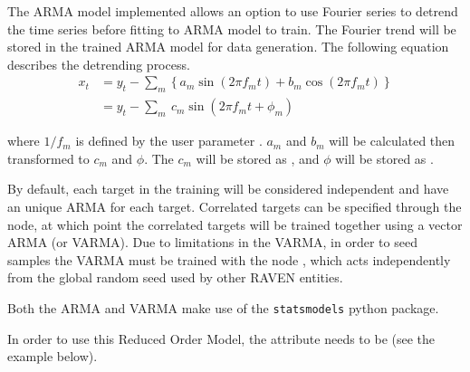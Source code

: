 The ARMA model implemented allows an option to use Fourier series to detrend the time series before fitting to ARMA model to
train. The Fourier trend will be stored in the trained ARMA model for data generation. The following equation
describes the detrending
process.
\begin{equation*}
\begin{aligned}
x_t &= y_t - \sum_m\left\{a_m\sin(2\pi f_mt)+b_m\cos(2\pi f_mt)\right\}  \\
&=y_t - \sum_m\ c_m\sin(2\pi f_mt+\phi_m)
\end{aligned}
\end{equation*}

where $1/f_m$ is defined by the user parameter . \nb $a_m$ and $b_m$ will be calculated then transformed to 
$c_m$ and $\phi$. The $c_m$ will be stored as , and $\phi$ will be stored as .

By default, each target in the training will be considered independent and have an unique ARMA for each
target.  Correlated targets can be specified through the  node, at which point
the correlated targets will be trained together using a vector ARMA (or VARMA). Due to limitations in
the VARMA, in order to seed samples the VARMA must be trained with the node , which acts
independently from the global random seed used by other RAVEN entities.

Both the ARMA and VARMA make use of the \texttt{statsmodels} python package.

%
In order to use this Reduced Order Model, the  attribute
 needs to be  (see the example
below).
%
\subnodeIntro

